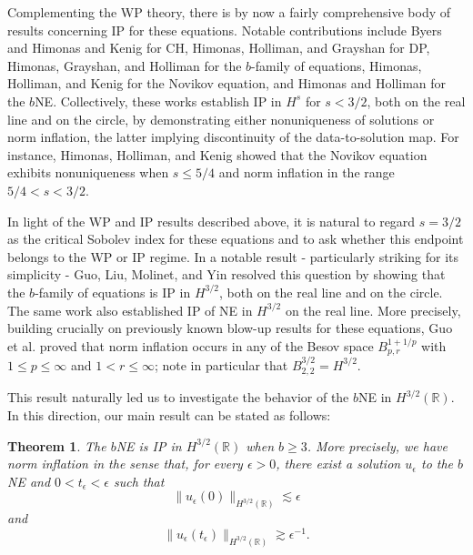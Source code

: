 \documentclass{amsart}
\newtheorem{theorem}{Theorem}
\newcommand{\R}{\mathbb R}
\begin{document}
Complementing the WP theory, there is by now a fairly comprehensive body of results concerning IP for these equations. Notable contributions include Byers \cite{B06} and Himonas and Kenig \cite{HK09}  for CH, Himonas, Holliman, and Grayshan \cite{HHG14} for DP, Himonas, Grayshan, and Holliman \cite{HGH16} for the $b$-family of equations, Himonas, Holliman, and Kenig \cite{HHK18} for the Novikov equation, and Himonas and Holliman \cite{HH22} for the $b$NE. Collectively, these works establish IP in $H^s$ for $s<3/2$, both on the real line and on the circle, by demonstrating either nonuniqueness of solutions or norm inflation, the latter implying discontinuity of the data-to-solution map. For instance, Himonas, Holliman, and Kenig \cite{HHK18} showed that the Novikov equation exhibits nonuniqueness when $s\leq 5/4$ and norm inflation in the range $5/4<s<3/2$. 

In light of the WP and IP results described above, it is natural to regard $s=3/2$ as the critical Sobolev index for these equations and to ask whether this endpoint belongs to the WP or IP regime. In a notable result - particularly striking for its simplicity - Guo, Liu, Molinet, and Yin \cite{GLM19} resolved this question by showing that the $b$-family of equations is IP in $H^{3/2}$, both on the real line and on the circle. The same work also established IP of NE in $H^{3/2}$ on the real line. More precisely, building crucially on previously known blow-up results for these equations, Guo et al. \cite{GLM19} proved that norm inflation occurs in any of the Besov space $B^{1+1/p}_{p,r}$  with $1\leq p\leq \infty$ and $1< r\leq \infty$; note in particular that $B^{3/2}_{2,2}=H^{3/2}$.

This result naturally led us to investigate the behavior of the $b$NE in $H^{3/2}(\R)$. In this direction, our main result can be stated as follows:

\begin{theorem}
The $b$NE is IP in $H^{3/2}(\R)$ when $b\geq 3$. More precisely, we have norm inflation in the sense that, for every $\epsilon>0$, there exist a solution $u_\epsilon$ to the $b$NE and $0<t_\epsilon<\epsilon$ such that
\begin{equation}
\|u_\epsilon(0)\|_{H^{3/2}(\R)}\lesssim \epsilon \label{0}
\end{equation}
and
\begin{equation}
\|u_\epsilon(t_\epsilon)\|_{H^{3/2}(\R)}\gtrsim \epsilon^{-1}.\label{-1}
\end{equation}
\label{main}
\end{theorem} 
\end{document}
